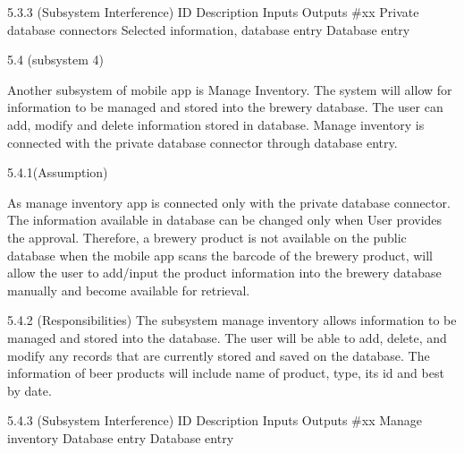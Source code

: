 5.3.3 (Subsystem Interference)
ID 	Description 	                      Inputs 	                           Outputs 
#xx 	Private database connectors Selected information, database entry	Database entry




5.4 (subsystem 4)


Another subsystem of mobile app is Manage Inventory. The system will allow for information to be managed and stored into the brewery database. The user can add, modify and delete information stored in database. Manage inventory is connected with the private database connector through database entry. 

5.4.1(Assumption)

As manage inventory app is connected only with the private database connector. The information available in database can be changed only when User provides the approval.
 Therefore, a brewery product is not available on the public database when the mobile app scans the barcode of the brewery product, will allow the user to add/input the product information into the brewery database manually and become available for retrieval.

5.4.2 (Responsibilities)
The subsystem manage inventory allows information to be managed and stored into the database. The user will be able to add, delete, and modify any records that are currently stored and saved on the database. The information of beer products will include name of product, type, its id and best by date.

5.4.3 (Subsystem Interference)
ID 	Description 	  Inputs 	    Outputs 
#xx 	Manage inventory Database entry	Database entry





	

	

